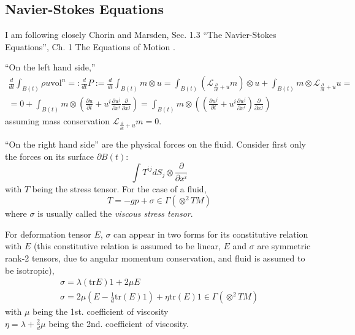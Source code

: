 \documentclass[twoside,landscape,10pt]{amsart}
\theoremstyle{plain}
\theoremstyle{definition}
\theoremstyle{remark}
\theoremstyle{remark}
\begin{document}
\begin{multicols*}{2}
\section{Navier-Stokes Equations}

I am following closely Chorin and Marsden, Sec. 1.3 ``The Navier-Stokes Equations'', Ch. 1 The Equations of Motion \cite{AChorinJMarsden2000}.

``On the left hand side,''
\[
\begin{gathered}
  \frac{d}{dt} \int_{B(t)} \rho u \text{vol}^n =: \frac{d}{dt} P := \frac{d}{dt} \int_{B(t)} m \otimes u = \int_{B(t)} ( \mathcal{L}_{ \frac{ \partial }{ \partial t} +u } m ) \otimes u + \int_{B(t)} m \otimes \mathcal{L}_{\frac{\partial}{\partial t} + u } u = \\
  = 0 + \int_{B(t)} m \otimes \left( \frac{ \partial u}{ \partial t} + u^i \frac{ \partial u^j}{ \partial x^i} \frac{ \partial }{ \partial x^j} \right) = \int_{B(t)} m \otimes \left( \left(\frac{ \partial u^j}{ \partial t} + u^i \frac{ \partial u^j}{ \partial x^i} \right) \frac{ \partial }{ \partial x^j} \right)
\end{gathered}
\]
assuming mass conservation $\mathcal{L}_{\frac{\partial }{\partial t} + u } m =0$.  

``On the right hand side'' are the physical forces on the fluid.  Consider first only the forces on its surface $\partial B(t)$:
\[
\int T^{ij}dS_j \otimes \frac{\partial}{\partial x^i}
\]
with $T$ being the stress tensor.  For the case of a fluid, 
\[
T = -gp + \sigma \in \Gamma(\otimes^2TM)
\]
where $\sigma$ is usually called the \emph{viscous stress tensor}.  

For deformation tensor $E$, $\sigma$ can appear in two forms for its constitutive relation with $E$ (this constitutive relation is assumed to be linear, $E$ and $\sigma$ are symmetric rank-2 tensors, due to angular momentum conservation, and fluid is assumed to be isotropic), 
\[
\begin{gathered}
  \sigma = \lambda ( \text{tr}E)1 + 2 \mu E \\ 
  \sigma = 2 \mu (E - \frac{1}{d}\text{tr}(E) 1) + \eta \text{tr}(E) 1 \in \Gamma(\otimes^2 TM)
\end{gathered}
\]
with $\mu$ being the 1st. coefficient of viscosity \\
\phantom{with }$\eta =  \lambda + \frac{2}{d} \mu$ being the 2nd. coefficient of viscosity.  


\end{multicols*}
\end{document}
